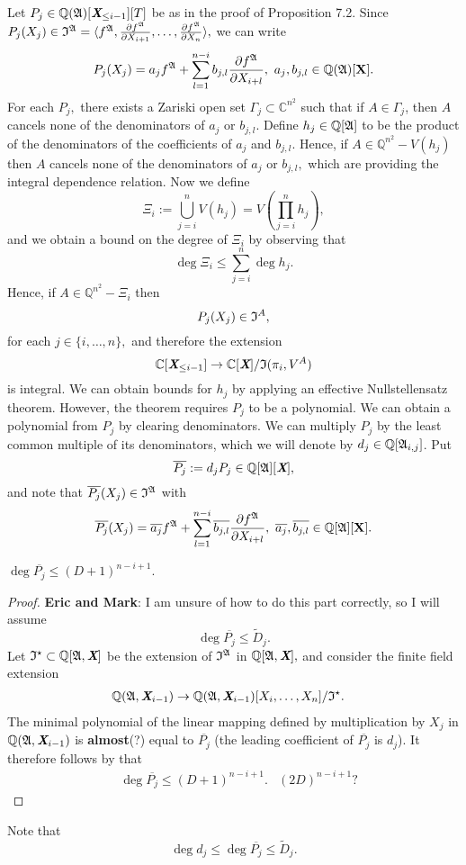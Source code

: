 \documentclass[sigconf]{acmart}
\def\Xb{\textit{\textbf{X}}}
\def\ajb{\overline{a_j}}
\def\bjb{\overline{b_{j,l}}}
\def\pjb{\overline{P_{j}}}
\def\C{\mathbb{C}}
\def\Q{\mathbb{Q}}
\def\Dt{\widetilde{D}}
\def\I{\frak{I}}
\def\Is{\frak{I}^{\star}}
\def\A{\frak{A}}
\begin{document}
%
Let $P_{j} \in \mathbb{Q}(\frak{A})[\Xb_{\leq i-1}][T]$ be as in the proof of Proposition 7.2. Since $P_{j}(X_j) \in\I^{\A}= \langle f^\A,\frac{\partial f^\A}{\partial X_{i+1}},\hdots,\frac{\partial f^\A}{\partial X_n} \rangle,$
 we can write
\[
P_{j}(X_j) = a_j f^{\A} + \sum_{l=1}^{n-i}b_{j,l} \frac{\partial f^\A}{\partial X_{i+l}}, ~a_j,b_{j,l} \in \mathbb{Q}(\A)[\textbf{X}].
\]
For each $P_j,$ there exists a Zariski open set $\Gamma_j \subset \C^{n^2}$ such that if $A \in \Gamma_j$,
then $A$ cancels none of the denominators of $a_{j}$ or $b_{j,l}$. Define $h_j \in \Q[\A]$ to be the product of the denominators of the coefficients of $a_j$ and $b_{j,l}$. Hence, if $A \in \Q^{n^2}-V(h_j)$ then $A$ cancels none of the denominators of $a_{j}$ or $b_{j,l},$ which are providing the integral dependence relation. Now we define 
\[
\Xi_i := \bigcup_{j=i}^n V(h_j) =V\left(\prod_{j=i}^n h_j \right), 
\]
and we obtain a bound on the degree of $\Xi_i$ by observing that
\[
\deg \Xi_i \leq \sum_{j=i}^n \deg h_j.
\]
Hence, if $A\in \Q^{n^2}-\Xi_i$ then
\[
P_j(X_j) \in \I^A,  
\]
for each $j \in \{i,\hdots,n\},$ and therefore the extension 
\[
\mathbb{C}[{\Xb}_{\leq i-1}]\rightarrow\mathbb{C}[\Xb]/\I(\pi_i,V^{A})
\]
is integral. We can obtain bounds for $h_j$ by applying an effective Nullstellensatz theorem. However, the theorem requires $P_{j}$ to be a polynomial. We can obtain a polynomial from $P_{j}$ by clearing denominators. We can multiply $P_{j}$ by the least common multiple of its denominators, which we will denote by $d_j \in \Q[\A_{i,j}]$. Put 
\[
\overline{P_{j}} := d_jP_{j}\in \Q[\A][\Xb],
\]
and note that $\pjb(X_j) \in \I^{\A}$ with 
\[
\pjb(X_j) = \ajb f^{\A} + \sum_{l=1}^{n-i}\bjb \frac{\partial f^\A}{\partial X_{i+l}}, ~\ajb,\bjb \in \mathbb{Q}[\A][\textbf{X}].
\]
%
\begin{proposition} 
$\deg \pjb\leq (D+1)^{n-i+1}.$ 
\end{proposition} 
%
\begin{proof}
\textbf{Eric and Mark}: I am unsure of how to do this part correctly, so I will assume 
\[
\deg \pjb\leq \Dt_j.
\]
Let $\Is \subset \Q[\A,\Xb]$ be the extension of $\I^{\A}$ in  $\Q[\A,\Xb],$ and consider the finite field extension
%
\begin{align*}
    \Q(\A,\Xb_{i-1}) &\rightarrow \Q(\A,\Xb_{i-1})[X_i,\hdots,X_n]/\Is.
\end{align*}
%
The minimal polynomial of the linear mapping defined by multiplication by $X_j$ in $\Q(\A,\Xb_{i-1})$ is \textbf{almost}(?) equal to $\pjb$ (the leading coefficient of $\pjb$ is $d_j$). It therefore follows by \cite[Proposition 1]{CGR} that
%
\begin{align*}
&\deg \pjb \leq (D+1)^{n-i+1}.&(2D)^{n-i+1}\textrm{?} 
\end{align*}
%
\end{proof}
%
Note that 
\[
\deg d_j \leq \deg \pjb \leq \Dt_j.
\]
%
\end{document}
